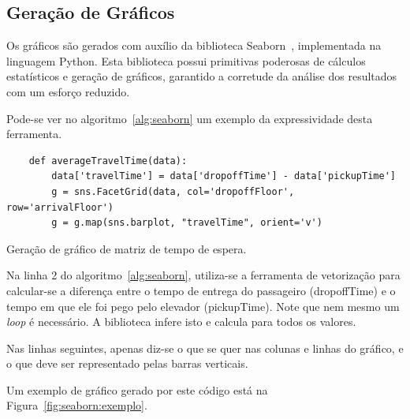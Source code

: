 \lipsum[1]

\subsection{Geração de Gráficos}

Os gráficos são gerados com auxílio da biblioteca Seaborn~\cite{seaborn},
implementada na linguagem Python. Esta biblioteca possui primitivas poderosas de
cálculos estatísticos e geração de gráficos, garantido a corretude da análise
dos resultados com um esforço reduzido.

Pode-se ver no algoritmo~\ref{alg:seaborn} um exemplo da expressividade desta
ferramenta.

\begin{algorithm}[htb]
  \centering
    \begin{verbatim}
    def averageTravelTime(data):
        data['travelTime'] = data['dropoffTime'] - data['pickupTime']
        g = sns.FacetGrid(data, col='dropoffFloor', row='arrivalFloor')
        g = g.map(sns.barplot, "travelTime", orient='v')
    \end{verbatim}
  \caption{Geração de gráfico de matriz de tempo de espera.}
  \label{alg:seaborn}
\end{algorithm}

Na linha 2 do algoritmo~\ref{alg:seaborn}, utiliza-se a ferramenta de
vetorização para calcular-se a diferença entre o tempo de entrega do passageiro
(\textsf{dropoffTime}) e o tempo em que ele foi pego pelo elevador
(\textsf{pickupTime}). Note que nem mesmo um \textit{loop} é necessário. A
biblioteca infere isto e calcula para todos os valores.

Nas linhas seguintes, apenas diz-se o que se quer nas colunas e linhas do
gráfico, e o que deve ser representado pelas barras verticais.

Um exemplo de gráfico gerado por este código está na Figura~\ref{fig:seaborn:exemplo}.

